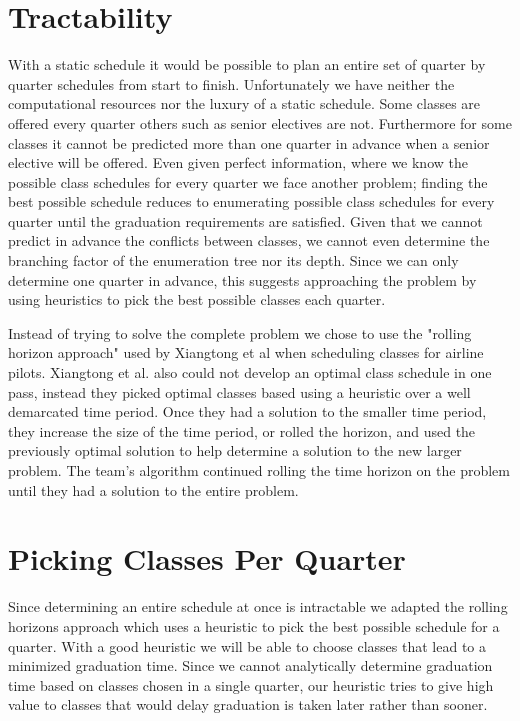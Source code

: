 \documentclass[11pt]{article} %
\begin{document}
\section{Tractability} With a static schedule it would be
possible to plan an entire set of quarter by quarter schedules from start to
finish. Unfortunately we have neither the computational resources nor the luxury
of a static schedule. Some classes are offered every quarter others such as
senior electives are not. Furthermore for some classes it cannot be predicted
more than one quarter in advance when a senior elective will be offered. Even
given perfect information, where we know the possible class schedules for every
quarter we face another problem; finding the best possible schedule reduces to
enumerating possible class schedules for every quarter until the graduation
requirements are satisfied.  Given that we cannot predict in advance the
conflicts between classes, we cannot even determine the branching factor of the
enumeration tree nor its depth. Since we can only determine one quarter in
advance, this suggests approaching the problem by using heuristics to pick the
best possible classes each quarter.

Instead of trying to solve the complete problem we chose to use the "rolling
horizon approach" used by Xiangtong et al \cite{xiangton:informs} when
scheduling classes for airline pilots. Xiangtong et al. also could not develop
an optimal class schedule in one pass, instead they picked optimal classes based
using a heuristic over a well demarcated time period. Once they had a solution
to the smaller time period, they increase the size of the time period, or rolled
the horizon, and used the previously optimal solution to help determine
a solution to the new larger problem. The team's algorithm continued rolling the
time horizon on the problem until they had a solution to the entire problem.

\section{Picking Classes Per Quarter} Since determining an entire schedule at
once is intractable we adapted the rolling horizons approach which uses
a heuristic to pick the best possible schedule for a quarter. With a good
heuristic we will be able to choose classes that lead to a minimized graduation
time. Since we cannot analytically determine graduation time based on classes
chosen in a single quarter, our heuristic tries to give high value to classes
that would delay graduation is taken later rather than sooner. 
\end{document}
